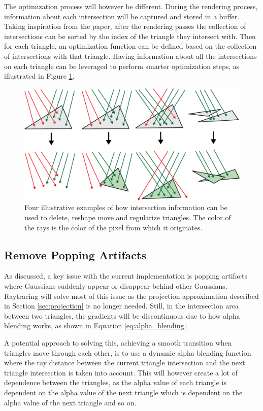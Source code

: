 The optimization process will however be different.
During the rendering process, information about each intersection will be captured and stored in a buffer.
Taking inspiration from the paper, after the rendering passes the collection of intersections can be sorted by the index of the triangle they intersect with.
Then for each triangle, an optimization function can be defined based on the collection of intersections with that triangle.
Having information about all the intersections on each triangle can be leveraged to perform smarter optimization steps, as illustrated in Figure \ref{fig:optimization}.



\begin{figure}
    \centering
    \includegraphics[width=\linewidth]{images/optimization.png}
    \caption{Four illustrative examples of how intersection information can be used to delete, reshape move and regularize triangles. The color of the rays is the color of the pixel from which it originates.}
    \label{fig:optimization}
\end{figure}

\subsection{Remove Popping Artifacts}
As discussed, a key issue with the current implementation is popping artifacts where Gaussians suddenly appear or disappear behind other Gaussians.
Raytracing will solve most of this issue as the projection approximation described in Section \ref{sec:projection} is no longer needed.
Still, in the intersection area between two triangles, the gradients will be discontinuous due to how alpha blending works, as shown in Equation \ref{eq:alpha_blending}.

A potential approach to solving this, achieving a smooth transition when triangles move through each other,
is to use a dynamic alpha blending function where the ray distance between the current triangle intersection and the next triangle intersection is taken into account.
This will however create a lot of dependence between the triangles, as the alpha value of each triangle is dependent on the alpha value of the next triangle which is dependent on the alpha value of the next triangle and so on.

